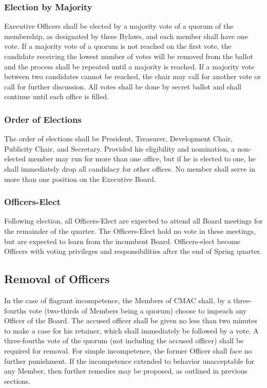 \documentclass{article}
\begin{document}
\subsubsection{Election by Majority}

Executive Officers shall be elected by a majority vote of a quorum
of the membership, as designated by these Bylaws, and each member
shall have one vote. If a majority vote of a quorum is not reached
on the first vote, the candidate receiving the lowest number of votes
will be removed from the ballot and the process shall be repeated
until a majority is reached. If a majority vote between two candidates
cannot be reached, the chair may call for another vote or call for
further discussion. All votes shall be done by secret ballot and shall
continue until each office is filled.

\subsubsection{Order of Elections}

The order of elections shall be President, Treasurer, Development
Chair, Publicity Chair, and Secretary. Provided his eligibility and nomination,
a non-elected member may run for more than one office, but if he is
elected to one, he shall immediately drop all candidacy for other
offices. No member shall serve in more than one position on the Executive
Board.
\subsubsection{Officers-Elect}
Following election, all Officers-Elect are expected to attend all Board meetings
for the remainder of the quarter. The Officers-Elect hold no vote in these
meetings, but are expected to learn from the incumbent Board. Officers-elect
become Officers with voting privileges and responsibilities after the end of
Spring quarter.

\subsection{Removal of Officers}

In the case of flagrant incompetence, the Members of CMAC shall, by a
three-fourths vote (two-thirds of Members being a quorum) choose to impeach any
Officer of the Board. The accused officer shall be given no less than two
minutes to make a case for his retainer, which shall immediately be followed by
a vote. A three-fourths vote of the quorum (not including the accused officer)
shall be required for removal. For simple incompetence, the former Officer shall
face no further punishment. If the incompetence extended to behavior
unacceptable for any Member, then further remedies may be proposed, as outlined
in previous sections.
\end{document}
